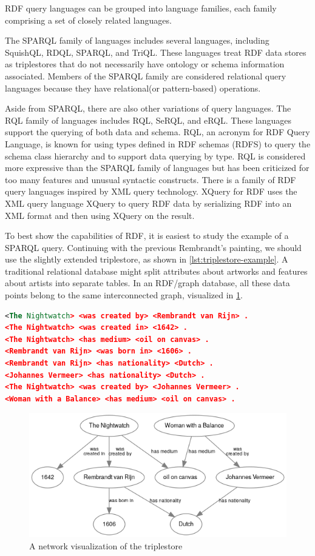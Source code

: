 \documentclass[thesis=M,english,hidelinks]{FITthesis}[2019/12/23]
\begin{document}
\gls{RDF} query languages can be grouped into language families, each family comprising a set of closely related languages.

The \gls{SPARQL} family of languages includes several languages, including  SquishQL, RDQL, SPARQL, and TriQL. These languages treat RDF data stores as triplestores that do not necessarily have ontology or schema information associated. Members of the SPARQL family are considered relational query languages because they have relational(or pattern-based) operations.

Aside from \gls{SPARQL}, there are also other variations of query languages. The RQL family of languages includes RQL, SeRQL, and eRQL. These languages support the querying of both data and schema. RQL, an acronym for RDF Query Language, is known for using types defined in RDF schemas (RDFS) to query the schema class hierarchy and to support data querying by type. RQL is considered more expressive than the SPARQL family of languages but has been criticized for too many features and unusual syntactic constructs. There is a family of RDF query languages inspired by XML query technology. XQuery for RDF uses the XML query language XQuery to query RDF data by serializing RDF into an XML format and then using XQuery on the result.

To best show the capabilities of \gls{RDF}, it is easiest to study the example of a \gls{SPARQL} query. Continuing with the previous Rembrandt's painting, we should use the slightly extended triplestore, as shown in \ref{lst:triplestore-example}. A traditional relational database might split attributes about artworks and features about artists into separate tables. In an RDF/graph database, all these data points belong to the same interconnected graph, visualized in \ref{fig:sparqlexamplegraph}.

\begin{lstlisting}[language=XML, caption=Example triplestore for SPARQL query, label = {lst:triplestore-example}]
<The Nightwatch> <was created by> <Rembrandt van Rijn> .
<The Nightwatch> <was created in> <1642> .
<The Nightwatch> <has medium> <oil on canvas> .
<Rembrandt van Rijn> <was born in> <1606> .
<Rembrandt van Rijn> <has nationality> <Dutch> .
<Johannes Vermeer> <has nationality> <Dutch> .
<The Nightwatch> <was created by> <Johannes Vermeer> .
<Woman with a Balance> <has medium> <oil on canvas> .
\end{lstlisting}

\begin{figure}
	\centering
	\includegraphics[width=0.7\linewidth]{sparql_example_graph}
	\caption{A network visualization of the triplestore}
	\label{fig:sparqlexamplegraph}
\end{figure}
\end{document}
